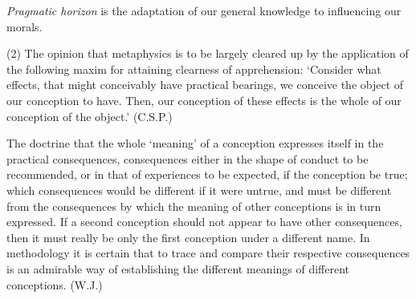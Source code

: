 \documentclass{article}
\begin{document}
\textit{Pragmatic horizon} is the adaptation of our general knowledge to influencing our morals.


(2) The opinion that metaphysics is to be largely cleared up by the application of the following maxim for attaining clearness of apprehension: `Consider what effects, that might conceivably have practical bearings, we conceive the object of our conception to have. Then, our conception of these effects is the whole of our conception of the object.' \hfill (C.S.P.)

The doctrine that the whole `meaning' of a conception expresses itself in the practical consequences, consequences either in the shape of conduct to be recommended, or in that of experiences to be expected, if the conception be true; which consequences would be different if it were untrue, and must be different from the consequences by which the meaning of other conceptions is in turn expressed. If a second conception should not appear to have other consequences, then it must really be only the first conception under a different name. In methodology it is certain that to trace and compare their respective consequences is an admirable way of establishing the different meanings of different conceptions. \hfill (W.J.)

\end{document}
